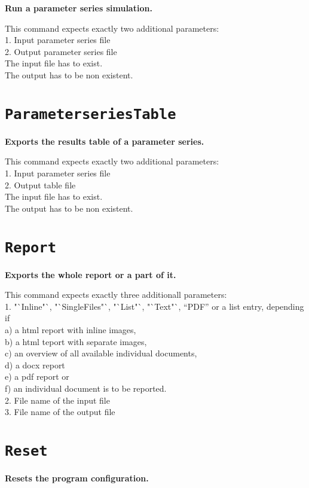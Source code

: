 \textbf{Run a parameter series simulation.}

This command expects exactly two additional parameters:\\
1. Input parameter series file\\
2. Output parameter series file\\
The input file has to exist.\\
The output has to be non existent.

\section{\texttt{ParameterseriesTable}}

\textbf{Exports the results table of a parameter series.}

This command expects exactly two additional parameters:\\
1. Input parameter series file\\
2. Output table file\\
The input file has to exist.\\
The output has to be non existent.

\section{\texttt{Report}}

\textbf{Exports the whole report or a part of it.}

This command expects exactly three additionall parameters:\\
1. "`Inline"`, "`SingleFiles"`, "`List"`, "`Text"`, "`PDF"' or a list entry, depending if\\
a) a html report with inline images,\\
b) a html teport with separate images,\\
c) an overview of all available individual documents,\\
d) a docx report\\
e) a pdf report or\\
f) an individual document is to be reported.\\
2. File name of the input file\\
3. File name of the output file

\section{\texttt{Reset}}

\textbf{Resets the program configuration.}

